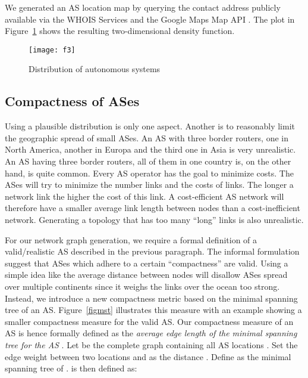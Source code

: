 \documentclass{sig-alternate-10pt}
\begin{document}
\begin{enumerate}
We generated an AS location map by querying the contact address publicly available via the WHOIS Services \cite{whoisripe,whoisarin,whoisafrinic,whoisapnic} and the Google Maps Map API \cite{mapsapi}. The plot in Figure~\ref{realasdist} shows the resulting two-dimensional density function. 














\begin{figure}
\texttt{[image: f3]}
\caption{Distribution of autonomous systems}
\label{realasdist}
\end{figure}

\subsection{Compactness of ASes}
\label{sec:compactness-ases}
Using a plausible distribution is only one aspect. Another is to reasonably limit the geographic spread of small ASes. An AS with three border routers, one in North America, another in Europa and the third one in Asia is very unrealistic. An AS having three border routers, all of them in one country is, on the other hand,  is quite common. Every AS operator has the goal to minimize costs. The ASes will try to minimize the number links and the costs of links. The longer a network link the higher the cost of this link. 
A cost-efficient AS network will therefore have a smaller average link length between nodes than a cost-inefficient network. Generating a topology that has too many ``long'' links is also unrealistic.

For our network graph generation, we require a formal definition of a valid/realistic AS described in the previous paragraph. The informal formulation suggest that ASes which adhere to a  certain ``compactness'' are valid. 
Using a simple idea like the average distance between nodes will disallow ASes spread over multiple continents since it weighs the links over the ocean too strong. Instead,  we introduce a new compactness metric based on the minimal spanning tree of an AS. Figure~\ref{figmst} illustrates this measure with an example showing a smaller compactness measure for the valid AS.  
Our compactness measure  of an AS  is hence formally defined as the\emph{ average edge length of the minimal spanning tree for the AS} . Let  be the complete graph containing all AS locations  . Set the edge weight between two locations  and  as the distance . Define  as the minimal spanning tree of .  is then defined as:



\end{enumerate}
\end{document}
